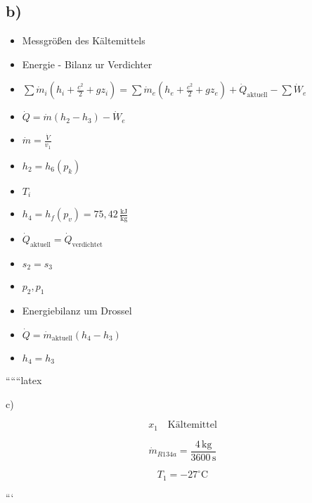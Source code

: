 \subsection*{b)}

\begin{itemize}
    \item Messgrößen des Kältemittels
    \item Energie - Bilanz ur Verdichter
    \item \(\sum \dot{m}_i (h_i + \frac{c^2}{2} + g z_i) = \sum \dot{m}_e (h_e + \frac{c^2}{2} + g z_e) + \dot{Q}_{\text{aktuell}} - \sum \dot{W}_e\)
    \item \(\dot{Q} = \dot{m} (h_2 - h_3) - \dot{W}_e\)
    \item \(\dot{m} = \frac{\dot{V}}{v_1}\)
    \item \(h_2 = h_6 (p_{k})\)
    \item \(T_i\)
    \item \(h_4 = h_f (p_{v}) = 75,42 \, \frac{\text{kJ}}{\text{kg}}\)
    \item \(\dot{Q}_{\text{aktuell}} = \dot{Q}_{\text{verdichtet}}\)
    \item \(s_2 = s_3\)
    \item \(p_2, p_1\)
    \item Energiebilanz um Drossel
    \item \(\dot{Q} = \dot{m}_{\text{aktuell}} (h_4 - h_3)\)
    \item \(h_4 = h_3\)
\end{itemize}

``````latex


c)

\[ x_1 \quad \text{Kältemittel} \]

\[ \dot{m}_{R134a} = \frac{4 \, \text{kg}}{3600 \, \text{s}} \]

\[ T_1 = -27^\circ \text{C} \]

```